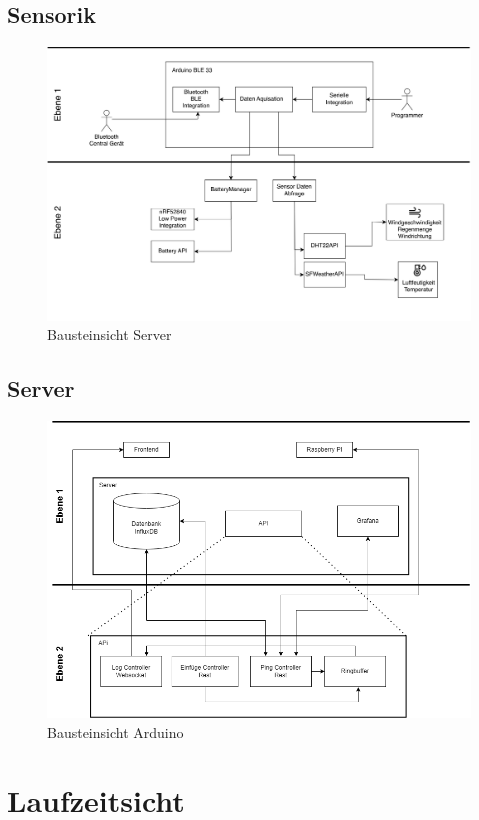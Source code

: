 \documentclass[
]{article}
\begin{document}
\subsection{Sensorik}
\begin{figure}[htbp]
	\centering
	\includegraphics[width=130mm]{resources/Bausteinschicht_Sara.png}
	\caption{Bausteinsicht Server}
	\label{fig:BausteinSensorik}
\end{figure}  
\subsection{Server}
\begin{figure}[htbp]
	\centering
	\includegraphics[width=130mm]{resources/Bausteinsicht_Server.png}
	\caption{Bausteinsicht Arduino}
	\label{fig:BausteinServer}
\end{figure}  

\section{Laufzeitsicht}
\end{document}
